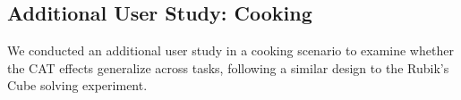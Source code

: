 \documentclass[sigconf,review,anonymous]{acmart}
\begin{document}





\subsection{Additional User Study: Cooking}
\label{sec:cookingStudy}
We conducted an additional user study in a cooking scenario to examine whether the CAT effects generalize across tasks, following a similar design to the Rubik's Cube solving experiment.

\end{document}
